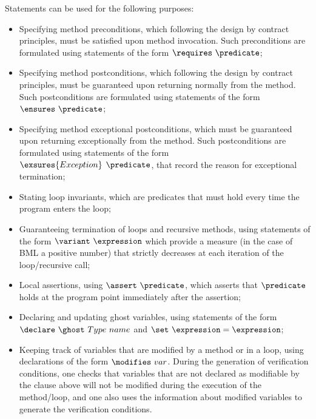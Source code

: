 Statements can be used for the following purposes:
\begin{itemize}
\item Specifying method preconditions, which following the design by
contract principles, must be satisfied upon method invocation. Such
preconditions are formulated using statements of the form $\requires \
\predicate$;


\item Specifying method postconditions, which following the design by
contract principles, must be guaranteed upon returning normally from the
method. Such postconditions are formulated using statements of the form
$\ensures\ \predicate$;

\item Specifying method exceptional postconditions, which must be
guaranteed upon returning exceptionally from the method. Such
postconditions are formulated using statements of the form \\
$\exsures{Exception} $ $ \predicate$, that record the reason for
exceptional termination;

\item Stating loop invariants, which are predicates that must hold
every time the program enters the loop;

\item Guaranteeing termination of loops and recursive methods, using
statements of the form $\variant\ \expression$ which provide a measure (in
the case of BML a positive number) that strictly decreases at each
iteration of the loop/recursive call;


\item Local assertions, using $\assert \ \predicate$, which asserts
that $\predicate$ holds at the program point immediately after the
assertion;

\item Declaring and updating ghost variables, using statements of the
form $\declare \ \ghost \ Type \ name$ and $ \set \ \expression = \expression$;

\item Keeping track of variables that are modified by a method or in a
loop, using declarations of the form $\modifies \ var$. During the
generation of verification conditions, one checks that variables that
are not declared as modifiable by the clause above will not be
modified during the execution of the method/loop, and one also uses
the information about modified variables to generate the verification
conditions.
\end{itemize}

